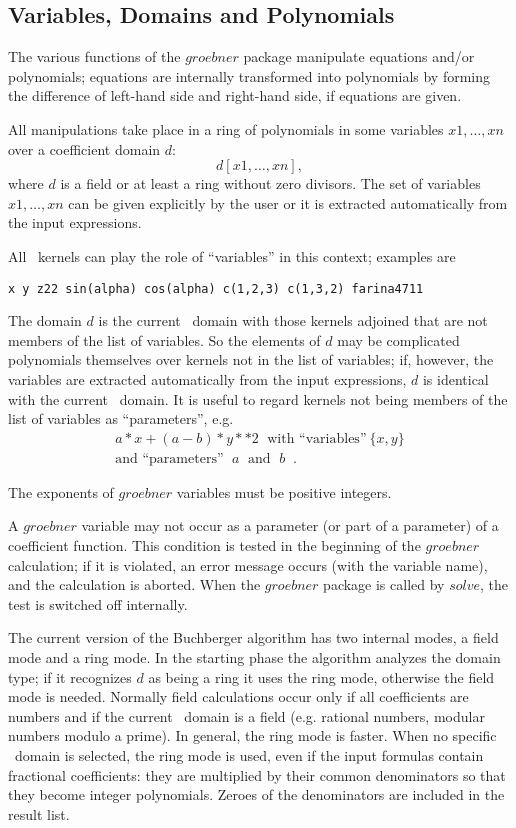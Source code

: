 \subsection{Variables, Domains and Polynomials}

The various functions of the $groebner$ package manipulate
equations and/or polynomials; equations are internally
transformed into  polynomials by forming the difference of
left-hand side and right-hand side, if equations are given.

All manipulations take place in a ring of polynomials in some
variables $x1, \ldots , xn$ over a coefficient domain $d$:
\[ d [x1,\ldots , xn], \]
where $d$ is a field or at least a ring without zero divisors.
The set of variables $x1,\ldots ,xn$ can be given explicitly by the
user or it is extracted automatically from the
input expressions.

All \REDUCE \  kernels can play the role of ``variables'' in this context;
examples are

\begin{verbatim}
x y z22 sin(alpha) cos(alpha) c(1,2,3) c(1,3,2) farina4711
\end{verbatim}

The domain $d$ is the current \REDUCE \  domain with those kernels
adjoined that are not members of the list of variables. So the
elements of $d$ may be complicated polynomials themselves over
kernels not in the list of variables; if, however, the variables are
extracted automatically from the input expressions, $d$ is identical
with the current \REDUCE \  domain. It is useful to regard kernels not
being members of the list of variables as ``parameters'', e.g.
\[
\begin{array}{c}
 a * x + (a - b) * y**2 \;\mbox{ with ``variables''}\ \{x,y\} \\
\mbox{and ``parameters''  $\;a\;$ and $\;b\;$}\;.
\end{array}
\]

The exponents of $groebner$ variables must be positive integers.

A $groebner$ variable may not occur as a parameter (or part
of a parameter) of a coefficient function. This condition is
tested in the beginning of the $groebner$ calculation; if it is
violated, an error message occurs (with the variable name), and the
calculation is aborted. When the $groebner$ package is called by
$solve$, the test is switched off internally.

The current version of the Buchberger algorithm has two internal
modes, a field mode and a ring mode. In the starting phase the
algorithm analyzes the domain type; if it recognizes $d$ as being a
ring it uses the ring mode, otherwise the field mode is needed.
Normally field calculations occur only if all coefficients are numbers
and if the current \REDUCE \  domain is a field (e.g. rational numbers,
modular numbers modulo a prime). In general, the ring mode is faster.
When no specific
\REDUCE \  domain is selected, the ring mode is used, even if the input
formulas contain fractional coefficients: they are multiplied by their
common denominators so that they become integer polynomials. Zeroes of the
denominators are included in the result list.

